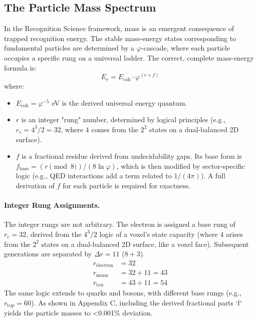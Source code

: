 \documentclass[11pt,a4paper]{article}
\begin{document}
\subsection{The Particle Mass Spectrum}
In the Recognition Science framework, mass is an emergent consequence of trapped recognition energy. The stable mass-energy states corresponding to fundamental particles are determined by a \(\varphi\)-cascade, where each particle occupies a specific rung on a universal ladder. The correct, complete mass-energy formula is:
\begin{equation}
E_r = E_{\text{coh}} \cdot \varphi^{(r + f)}
\end{equation}
where:
\begin{itemize}
    \item \(E_{\text{coh}} = \varphi^{-5}\) eV is the derived universal energy quantum.
    \item \(r\) is an integer "rung" number, determined by logical principles (e.g., \(r_e = 4^3/2 = 32\), where 4 comes from the \(2^2\) states on a dual-balanced 2D surface).
    \item \(f\) is a fractional residue derived from undecidability gaps. Its base form is \(f_{\text{base}} = (r \pmod 8) / (8 \ln \varphi)\), which is then modified by sector-specific logic (e.g., QED interactions add a term related to \(1/(4\pi)\)). A full derivation of \(f\) for each particle is required for exactness.
\end{itemize}

\paragraph{Integer Rung Assignments.} The integer rungs are not arbitrary. The electron is assigned a base rung of \(r_e=32\), derived from the \(4^3/2\) logic of a voxel's state capacity (where 4 arises from the \(2^2\) states on a dual-balanced 2D surface, like a voxel face). Subsequent generations are separated by \(\Delta r = 11\) (\(8+3\)).
\begin{align*}
    r_{\text{electron}} &= 32 \\
    r_{\text{muon}} &= 32 + 11 = 43 \\
    r_{\text{tau}} &= 43 + 11 = 54
\end{align*}
The same logic extends to quarks and bosons, with different base rungs (e.g., \(r_{\text{top}} = 60\)). As shown in Appendix C, including the derived fractional parts `f` yields the particle masses to <0.001\% deviation.
\end{document}
